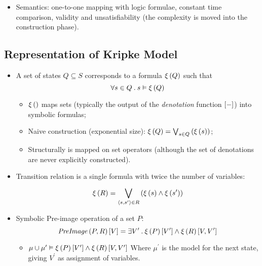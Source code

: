 \begin{itemize}
    \item   Semantics: one-to-one mapping with logic formulae, constant
            time comparison, validity and unsatisfiability (the complexity
            is moved into the construction phase).

    \end{itemize}

\subsection{Representation of Kripke Model}

    \begin{itemize}

    \item   A set of states $Q \subseteq S$ corresponds to a formula
            $\xi\left({Q}\right)$ such that
            \[ \forall s \in Q \:.\: s \vDash \xi\left({Q}\right) \]

        \begin{itemize}

        \item   $\xi\left({}\right)$ maps sets (typically the output of the
                \emph{denotation} function $\left[{-}\right]$) into symbolic
                formulas;

        \item   Naive construction (exponential size):
                $\xi\left({Q}\right) = \bigvee_{s \in Q}^{}\left({\xi\left({s}\right)}\right)$;

        \item   Structurally is mapped on set operators (although the set
                of denotations are never explicitly constructed).

        \end{itemize}

    \item   Transition relation is a single formula with
            twice the number of variables:
        \[
        \xi\left({R}\right) = \bigvee_{\left<{s, s^\prime}\right> \in R}^{}\left({\xi\left({s}\right) \wedge \xi\left({s^\prime}\right)}\right)
        \]

    \item   Symbolic Pre-image operation of a set $P$:
        \[
        \mbox{\emph{PreImage}}\left({P, R}\right)[V] = \exists V^\prime \:.\: \xi\left({P}\right)[V^\prime]
                             \wedge \xi\left({R}\right)[V, V^\prime]
        \]
        \begin{itemize}

        \item   $\mu \cup \mu^\prime \vDash \xi\left({P}\right)[V^\prime]
                            \wedge \xi\left({R}\right)[V, V^\prime]$
                Where $\mu^\prime$ is the model for the next state, giving
                $V^\prime$ as assignment of variables.


\end{itemize}
\end{itemize}
